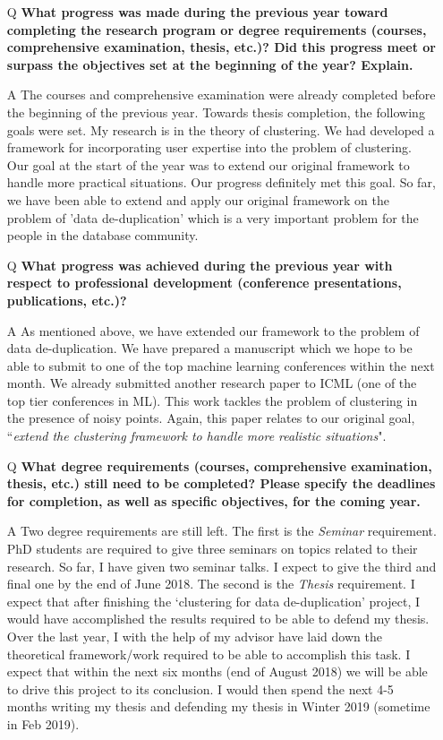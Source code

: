 \documentclass[12pt]{article}
\begin{document}
\begin{itemize}[leftmargin=*]
\item[Q] \textbf{What progress was made during the previous year toward completing the research program or degree requirements (courses, comprehensive examination, thesis, etc.)? Did this progress meet or surpass the objectives set at the beginning of the year? Explain.}
\item[A] \vspace{-0.1in} The courses and comprehensive examination were already completed before the beginning of the previous year. Towards thesis completion, the following goals were set. My research is in the theory of clustering. We had developed a framework for incorporating user expertise into the problem of clustering. Our goal at the start of the year was to extend our original framework to handle more practical situations. Our progress definitely met this goal. So far, we have been able to extend and apply our original framework on the problem of 'data de-duplication' which is a very important problem for the people in the database community.  

\item[Q] \textbf{What progress was achieved during the previous year with respect to professional development (conference presentations, publications, etc.)?}
\item[A] As mentioned above, we have extended our framework to the problem of data de-duplication. We have prepared a manuscript which we hope to be able to submit to one of the top machine learning conferences within the next month. We already submitted another research paper to ICML (one of the top tier conferences in ML). This work tackles the problem of clustering in the presence of noisy points. Again, this paper relates to our original goal, ``{\em extend the clustering framework to handle more realistic situations}".  

\item[Q] \textbf{What degree requirements (courses, comprehensive examination, thesis, etc.) still need to be completed? Please specify the deadlines for completion, as well as specific objectives, for the coming year.}
\item[A] Two degree requirements are still left. The first is the {\em Seminar} requirement. PhD students are required to give three seminars on topics related to their research. So far, I have given two seminar talks. I expect to give the third and final one by the end of June 2018. The second is the {\em Thesis} requirement. I expect that after finishing the `clustering for data de-duplication' project, I would have accomplished the results required to be able to defend my thesis. Over the last year, I with the help of my advisor have laid down the theoretical framework/work required to be able to accomplish this task. I expect that within the next six months (end of August 2018) we will be able to drive this project to its conclusion. I would then spend the next 4-5 months writing my thesis and defending my thesis in Winter 2019 (sometime in Feb 2019). 


\end{itemize}
\end{document}
